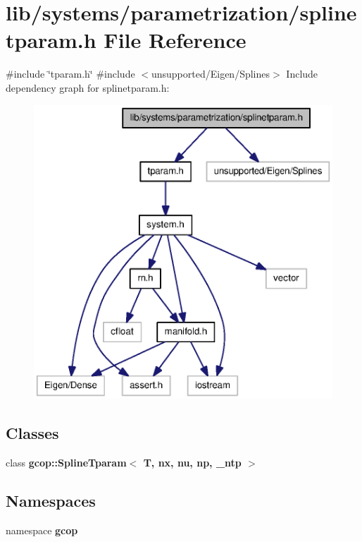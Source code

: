 \section{lib/systems/parametrization/splinetparam.h \-File \-Reference}
\label{splinetparam_8h}
{\ttfamily \#include \char`\"{}tparam.\-h\char`\"{}}\*
{\ttfamily \#include $<$unsupported/\-Eigen/\-Splines$>$}\*
\-Include dependency graph for splinetparam.\-h\-:\nopagebreak
\begin{figure}[H]
\begin{center}
\leavevmode
\includegraphics[width=350pt]{splinetparam_8h__incl}
\end{center}
\end{figure}
\subsection*{\-Classes}
\begin{DoxyCompactItemize}
\item 
class {\bf gcop\-::\-Spline\-Tparam$<$ T, nx, nu, np, \-\_\-ntp $>$}
\end{DoxyCompactItemize}
\subsection*{\-Namespaces}
\begin{DoxyCompactItemize}
\item 
namespace {\bf gcop}
\end{DoxyCompactItemize}

